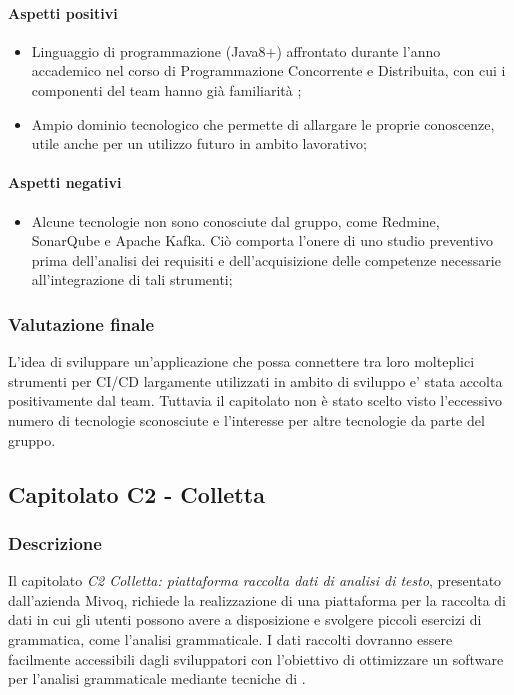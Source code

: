 	\paragraph{Aspetti positivi} 
	\begin{itemize}
		\item {Linguaggio di programmazione (Java8+) affrontato durante l'anno accademico nel corso di Programmazione Concorrente e Distribuita, con cui i componenti del team hanno già familiarità ;}
		\item{Ampio dominio tecnologico che permette di allargare le proprie conoscenze, utile anche per un utilizzo futuro in ambito lavorativo;}
	\end{itemize}
	\paragraph{Aspetti negativi}
	\begin{itemize}
		\item {Alcune tecnologie non sono conosciute dal gruppo, come Redmine, SonarQube e Apache Kafka. Ciò comporta l'onere di uno studio preventivo prima dell'analisi dei requisiti e dell'acquisizione delle competenze necessarie all'integrazione di tali strumenti;}
	\end{itemize} 
	\subsubsection{Valutazione finale}
	L'idea di sviluppare un'applicazione che possa connettere tra loro molteplici strumenti per CI/CD largamente utilizzati in ambito di sviluppo e' stata accolta positivamente dal team. Tuttavia il capitolato non è stato scelto visto l'eccessivo numero di tecnologie sconosciute e l'interesse per altre tecnologie da parte del gruppo.
	
	\subsection{Capitolato C2 - Colletta}
	\subsubsection{Descrizione}
	Il capitolato \emph{C2 Colletta: piattaforma raccolta dati di analisi di testo}, presentato dall'azienda Mivoq, richiede la realizzazione di una piattaforma per la raccolta di dati in cui gli utenti possono avere a disposizione e svolgere piccoli esercizi di grammatica, come l'analisi grammaticale.
	I dati raccolti dovranno essere facilmente accessibili dagli sviluppatori con l'obiettivo di ottimizzare un software per l'analisi grammaticale mediante tecniche di .   
	
